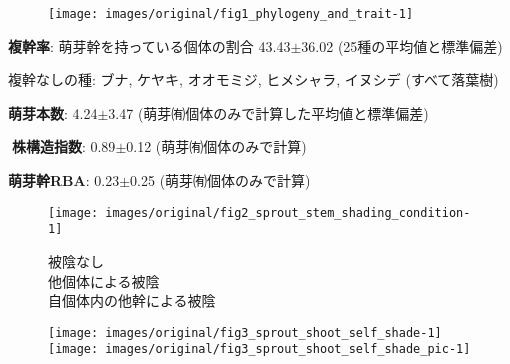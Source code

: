 \documentclass[a0, 30pt, plainboxedsections]{sciposter} %
\begin{document}
\begin{multicols}{2}

\begin{mdframed}[style=subsection.frame,frametitle={\textbf{\huge{\ding{192}}\LARGE{25種の株構造は種間で大きく異なる}}}]

\vspace{-1.0em}
\begin{figure}
  \centering
    \texttt{[image: images/original/fig1\_phylogeny\_and\_trait-1]}
\end{figure}

\vspace{-1em}
\faCaretRight \textbf{複幹率}{\small: 萌芽幹を持っている個体の割合} 43.43$\pm$36.02 {\small (25種の平均値と標準偏差)}


{\small
\hspace*{4.5em}複幹なしの種: ブナ, ケヤキ, オオモミジ, ヒメシャラ, イヌシデ (すべて落葉樹)

}

\faCaretRight \textbf{萌芽本数}: 4.24$\pm$3.47 {\small(萌芽㈲個体のみで計算した平均値と標準偏差)}

\faCaretRight \textbf{株構造指数}: 0.89$\pm$0.12 {\small(萌芽㈲個体のみで計算)}


\faCaretRight \textbf{萌芽幹RBA}: 0.23$\pm$0.25 {\small(萌芽㈲個体のみで計算)}

\end{mdframed}

\begin{mdframed}[style=subsection.frame,frametitle=\textbf{\huge{\ding{194}}\LARGE{萌芽性が強い種ほど自己被陰率が下がる}}]

\vspace{-0.5em}
\begin{figure}
 \begin{minipage}{0.25\hsize}
  \centering
   \texttt{[image: images/original/fig2\_sprout\_stem\_shading\_condition-1]}
   
  \vspace{-0.4em}\flushleft 
    {\tiny \textcolor[HTML]{4D4D4D}{\faStop} 被陰なし\\
    \textcolor[HTML]{C0C0C0}{\faStop} 他個体による被陰\\
    \vspace{-1.6em}\textcolor[HTML]{FFFFFF}{\faStop} 自個体内の他幹による被陰}
 \end{minipage}
 \begin{minipage}{0.75\hsize}
  \centering
   \texttt{[image: images/original/fig3\_sprout\_shoot\_self\_shade-1]}
   \texttt{[image: images/original/fig3\_sprout\_shoot\_self\_shade\_pic-1]}
   

\end{minipage}
\end{figure}
\end{mdframed}
\end{multicols}
\end{document}

